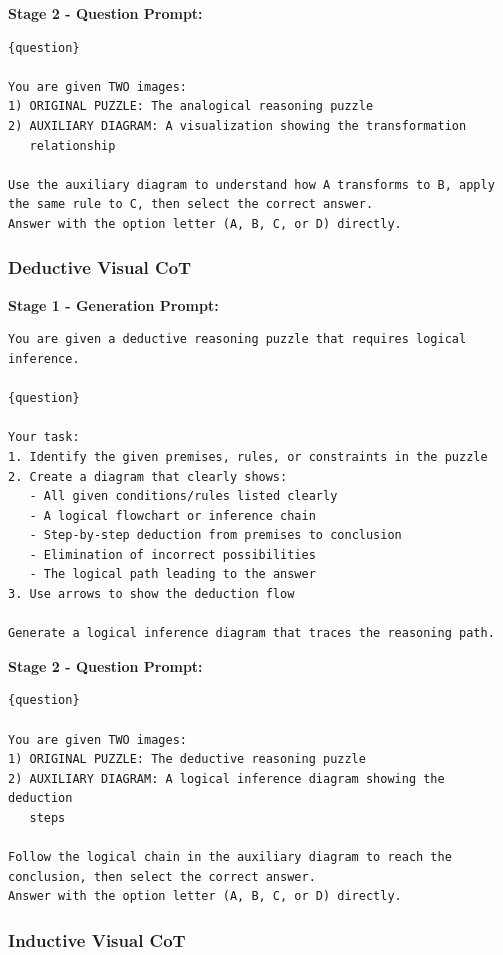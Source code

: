 \documentclass{article}
\theoremstyle{plain}
\theoremstyle{definition}
\theoremstyle{remark}
\begin{document}
\textbf{Stage 2 - Question Prompt:}

\begin{verbatim}
{question}

You are given TWO images:
1) ORIGINAL PUZZLE: The analogical reasoning puzzle
2) AUXILIARY DIAGRAM: A visualization showing the transformation
   relationship

Use the auxiliary diagram to understand how A transforms to B, apply
the same rule to C, then select the correct answer.
Answer with the option letter (A, B, C, or D) directly.
\end{verbatim}

\subsubsection{Deductive Visual CoT}

\textbf{Stage 1 - Generation Prompt:}

\begin{verbatim}
You are given a deductive reasoning puzzle that requires logical
inference.

{question}

Your task:
1. Identify the given premises, rules, or constraints in the puzzle
2. Create a diagram that clearly shows:
   - All given conditions/rules listed clearly
   - A logical flowchart or inference chain
   - Step-by-step deduction from premises to conclusion
   - Elimination of incorrect possibilities
   - The logical path leading to the answer
3. Use arrows to show the deduction flow

Generate a logical inference diagram that traces the reasoning path.
\end{verbatim}

\textbf{Stage 2 - Question Prompt:}

\begin{verbatim}
{question}

You are given TWO images:
1) ORIGINAL PUZZLE: The deductive reasoning puzzle
2) AUXILIARY DIAGRAM: A logical inference diagram showing the deduction
   steps

Follow the logical chain in the auxiliary diagram to reach the
conclusion, then select the correct answer.
Answer with the option letter (A, B, C, or D) directly.
\end{verbatim}

\subsubsection{Inductive Visual CoT}
\end{document}
